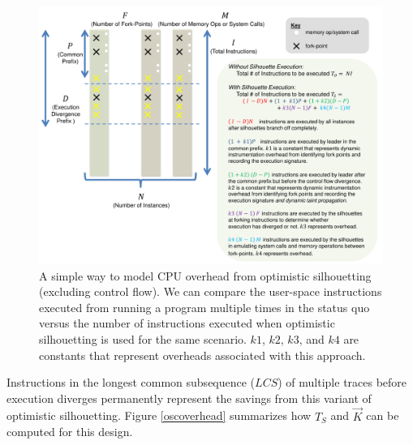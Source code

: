 \begin{figure}
  \centering
  \includegraphics[scale=0.75, trim=3cm 0cm 1cm 0cm]{calc2.pdf}
  \caption[Modeling CPU overhead from optimistic silhouetting (excluding control flow)]%
          {A simple way to model CPU overhead from optimistic silhouetting (excluding control flow).
            We can compare the user-space instructions executed from running
            a program multiple times in the status quo
            versus the number of instructions executed
            when optimistic silhouetting is used for
            the same scenario. $k1$, $k2$, $k3$, and $k4$
            are constants that represent overheads
            associated with this approach.}
  \label{osncoverhead}
\end{figure}

 \newline
Instructions in the longest common subsequence ($LCS$)
of multiple traces before execution
diverges permanently represent the savings from 
this variant of optimistic silhouetting.
Figure \ref{oscoverhead} summarizes
how $T_{S}$ and $\vec K$ can be computed
for this design. \newline

